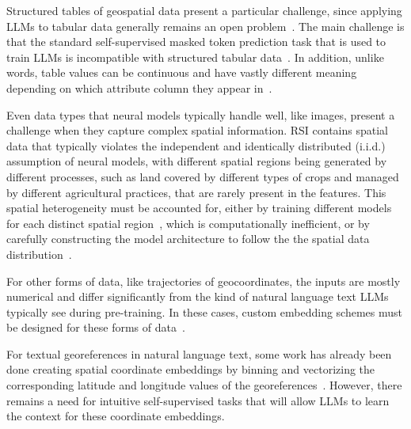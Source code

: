 Structured tables of geospatial data present a particular challenge, since applying LLMs to tabular data generally remains an open problem~\cite{Gao2023,Cong2023}.
The main challenge is that the standard self-supervised masked token prediction task that is used to train LLMs is incompatible with structured tabular data~\cite{Tan2023, Qi2023}.
In addition, unlike words, table values can be continuous and have vastly different meaning depending on which attribute column they appear in~\cite{Qi2023}.


Even data types that neural models typically handle well, like images, present a challenge when they capture complex spatial information.
%
RSI contains spatial data that typically violates the independent and identically distributed (i.i.d.) assumption of neural models, with different spatial regions being generated by different processes, such as land covered by different types of crops and managed by different agricultural practices, that are rarely present in the features. 
This spatial heterogeneity must be accounted for, either by training different models for each distinct spatial region~\cite{Gupta2021}, which is computationally inefficient, or by carefully constructing the model architecture to follow the the spatial data distribution~\cite{Xie2021b}.


For other forms of data, like trajectories of geocoordinates, the inputs are mostly numerical and differ significantly from the kind of natural language text LLMs typically see during pre-training.
In these cases, custom embedding schemes must be designed for these forms of data~\cite{Hu2023}.
%
%

For textual georeferences in natural language text, some work has already been done creating spatial coordinate embeddings by binning and vectorizing the corresponding latitude and longitude values of the georeferences~\cite{Li2021}.
However, there remains a need for intuitive self-supervised tasks that will allow LLMs to learn the context for these coordinate embeddings.
%


